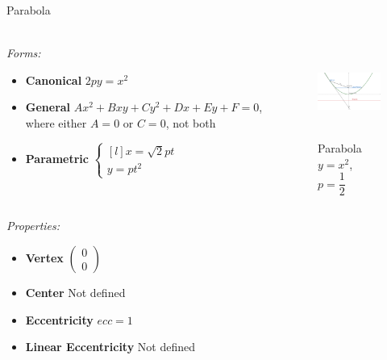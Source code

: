 \documentclass[aspectratio=169,notes]{beamer}
\begin{document}
\begin{frame}[t]{Parabola}
\framesubtitle{}
    \scriptsize
    \vspace{-0.4cm}
\begin{columns}[T,onlytextwidth]
    \begin{column}{0.59\textwidth}
        \textit{Forms:} \\
\begin{itemize}
    \item \textbf{Canonical} $2py=x^2$
    \item \textbf{General} $Ax^2+Bxy+Cy^2+Dx+Ey+F=0$, where either $A=0$ or $C=0$, not both
    \item \textbf{Parametric} $\left\{\begin{matrix*}[l] x = \sqrt{2}pt\\ y = pt^2\end{matrix*}\right.$
\end{itemize}
    \end{column}
    \begin{column}{0.39\textwidth}
        \begin{figure}[H]
            \centering\includegraphics[height=3cm,width=1\textwidth,keepaspectratio]{Parabola.png}
            \vspace{-0.5cm}
            \caption*{\scriptsize Parabola $y=x^2$, $p=\dfrac{1}{2}$}
            \label{fig:Parabola.png}
        \end{figure}
    \end{column}
\end{columns}
\vspace{-0.6cm}
\textit{Properties:}
\begin{multicols}{3}
    \begin{itemize}
        \item \textbf{Vertex} $\begin{pmatrix} 0\\0 \end{pmatrix}$
        \item \textbf{Center} Not defined
        \item \textbf{Eccentricity} $ecc = 1$
        \item \textbf{Linear Eccentricity} Not defined

\end{itemize}
\end{multicols}
\end{frame}
\end{document}
